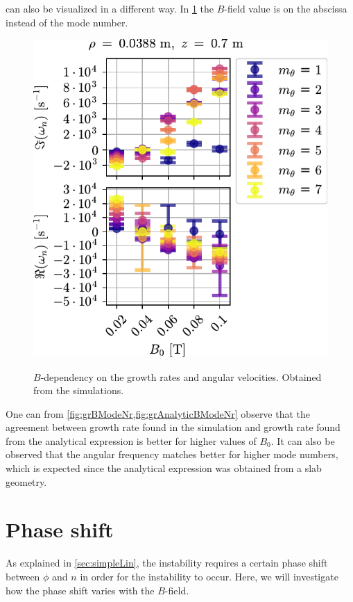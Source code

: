  can also be visualized in a different way.
In \cref{fig:grBModeNr} the $B$-field value is on the abscissa instead of the mode number.
%
\begin{figure}[htb]
        \centering
        \includegraphics{fig/results/growthRates/growthRatesB0ModeNr}
        \label{fig:grBModeNr}
        \caption{$B$-dependency on the growth rates and angular velocities.
            Obtained from the simulations.}
\end{figure}
%
One can from \cref{fig:grBModeNr,fig:grAnalyticBModeNr} observe that the agreement between growth rate found in the simulation and growth rate found from the analytical expression is better for higher values of $B_0$.
It can also be observed that the angular frequency matches better for higher mode numbers, which is expected since the analytical expression was obtained from a slab geometry.

\section{Phase shift}
%
As explained in \ref{sec:simpleLin}, the instability requires a certain phase shift between $\phi$ and $n$ in order for the instability to occur.
Here, we will investigate how the phase shift varies with the $B$-field.

